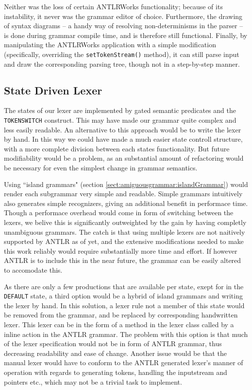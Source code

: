 Neither was the loss of certain ANTLRWorks functionality; because of its
instability, it never was the grammar editor of choice. Furthermore, the
drawing of syntax diagrams -- a handy way of resolving non-determinisms in the
parser -- is done during grammar compile time, and is therefore still
functional. Finally, by manipulating the ANTLRWorks application with a simple
modification (specifically, overriding the \verb!setTokenStream()! method), it
can still parse input and draw the corresponding parsing tree, though not in a
step-by-step manner.

\subsection{State Driven Lexer}
\label{sect:discussion:stateDriven}
The states of our lexer are implemented by gated semantic predicates and the
\verb!TOKENSWITCH! construct. This may have made our grammar quite complex and
less easily readable. An alternative to this approach would be to write the
lexer by hand. In this way we could have made a much easier state controll
structure, with a more complete division between each states functionality.
But future modifiability would be a problem, as an substantial amount of
refactoring would be necessary for even the simplest change in grammar
semantics.

Using ``island grammars" (section \ref{sect:amiguousgrammar:islandGrammar}) would
render each subgrammar very simple and readable. Simple grammars intuitively
also generates simple recognizers, giving an additional benefit in performace
time. Though a performace overhead would come in form of switching between the
lexers, we belive this is significantly outweighted by the gain by having
completly unambiguous grammars. The catch is that using multiple lexers are not
naitively supported by ANTLR as of yet, and the extensive modifications needed
to make this work reliably would require substantially more time and effort. If
however ANTLR is to include this in the near future, the grammar can be easily
altered to accomodate this.

As there are only a few productions that are available per state, exept for in the \verb!DEFAULT! state, a third option would be a hybrid of island grammars and writing the lexer by hand. In this solution, a lexer rule not a member of this state would be removed from the grammar, and be replaced by corresponding handwritten lexer. This lexer can be in the form of a method in the lexer class called by a inline action in the ANTLR grammar. The problem with this option is that much of the lexer specification would not be in form of ANTLR grammar, thus decreasing readability and ease of change. Another issue would be that the manual lexer would have to conform to the ANTLR generated lexer's manner of operation with regards to generating tokens, handling the inputstream and pointers etc., which may not be a trivial task to implement.